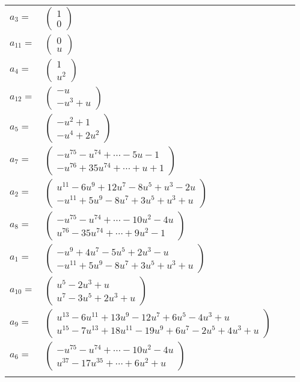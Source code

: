 \documentclass[1p]{elsarticle_modified}
\theoremstyle{definition}
\begin{document}
\begin{tabular}{m{7pt} m{180pt} m{7pt} m{180pt} }
\flushright $a_{3}=$&$\begin{pmatrix}1\\0\end{pmatrix}$ \\
\flushright $a_{11}=$&$\begin{pmatrix}0\\u\end{pmatrix}$ \\
\flushright $a_{4}=$&$\begin{pmatrix}1\\u^2\end{pmatrix}$ \\
\flushright $a_{12}=$&$\begin{pmatrix}- u\\- u^3+u\end{pmatrix}$ \\
\flushright $a_{5}=$&$\begin{pmatrix}- u^2+1\\- u^4+2 u^2\end{pmatrix}$ \\
\flushright $a_{7}=$&$\begin{pmatrix}- u^{75}- u^{74}+\cdots-5 u-1\\- u^{76}+35 u^{74}+\cdots+u+1\end{pmatrix}$ \\
\flushright $a_{2}=$&$\begin{pmatrix}u^{11}-6 u^9+12 u^7-8 u^5+u^3-2 u\\- u^{11}+5 u^9-8 u^7+3 u^5+u^3+u\end{pmatrix}$ \\
\flushright $a_{8}=$&$\begin{pmatrix}- u^{75}- u^{74}+\cdots-10 u^2-4 u\\u^{76}-35 u^{74}+\cdots+9 u^2-1\end{pmatrix}$ \\
\flushright $a_{1}=$&$\begin{pmatrix}- u^9+4 u^7-5 u^5+2 u^3- u\\- u^{11}+5 u^9-8 u^7+3 u^5+u^3+u\end{pmatrix}$ \\
\flushright $a_{10}=$&$\begin{pmatrix}u^5-2 u^3+u\\u^7-3 u^5+2 u^3+u\end{pmatrix}$ \\
\flushright $a_{9}=$&$\begin{pmatrix}u^{13}-6 u^{11}+13 u^9-12 u^7+6 u^5-4 u^3+u\\u^{15}-7 u^{13}+18 u^{11}-19 u^9+6 u^7-2 u^5+4 u^3+u\end{pmatrix}$ \\
\flushright $a_{6}=$&$\begin{pmatrix}- u^{75}- u^{74}+\cdots-10 u^2-4 u\\u^{37}-17 u^{35}+\cdots+6 u^2+u\end{pmatrix}$\\&\end{tabular}
\end{document}
